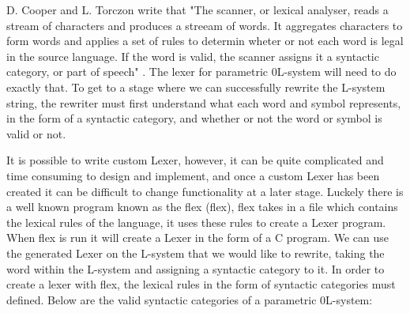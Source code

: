 \begin{flushleft}

D. Cooper and L. Torczon write that "The scanner, or lexical analyser, reads a stream of characters and produces a streeam of words. It aggregates characters to form words and applies a set of rules to determin wheter or not each word is legal in the source language. If the word is valid, the scanner assigns it a syntactic category, or part of speech" \cite{cooper2011engineering}. The lexer for parametric 0L-system will need to do exactly that. To get to a stage where we can successfully rewrite the L-system string, the rewriter must first understand what each word and symbol represents, in the form of a syntactic category, and whether or not the word or symbol is valid or not. \\

\vspace{5mm}

It is possible to write custom \gls{Lexer}, however, it can be quite complicated and time consuming to design and implement, and once a custom \gls{Lexer} has been created it can be difficult to change functionality at a later stage. Luckely there is a well known program known as the \acrlong{flex} (\acrshort{flex}), \acrshort{flex} takes in a file which contains the lexical rules of the language, it uses these rules to create a \gls{Lexer} program. When \acrshort{flex} is run it will create a \gls{Lexer} in the form of a C program. We can use the generated Lexer on the L-system that we would like to rewrite, taking the word within the L-system and assigning a syntactic category to it. In order to create a lexer with \acrshort{flex}, the lexical rules in the form of syntactic categories must defined. Below are the valid syntactic categories of a parametric 0L-system:


\end{flushleft}
